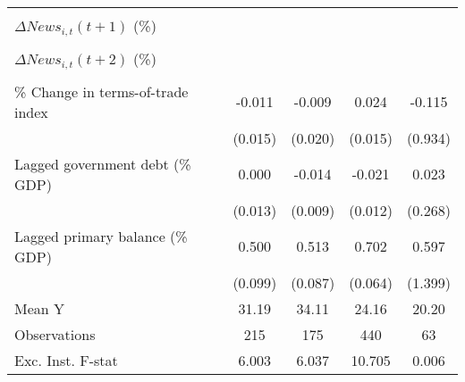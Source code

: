 {\begin{tabular}{l*{4}{c}}
                    &                     &                     &                     &                     \\
\addlinespace
$ \Delta News_{i,t}(t+1)$ (\%)&                     &                     &                     &                     \\
                    &                     &                     &                     &                     \\
\addlinespace
$ \Delta News_{i,t}(t+2)$ (\%)&                     &                     &                     &                     \\
                    &                     &                     &                     &                     \\
\addlinespace
\% Change in terms-of-trade index&      -0.011         &      -0.009         &       0.024         &      -0.115         \\
                    &     (0.015)         &     (0.020)         &     (0.015)         &     (0.934)         \\
\addlinespace
Lagged government debt (\% GDP)&       0.000         &      -0.014         &      -0.021\sym{*}  &       0.023         \\
                    &     (0.013)         &     (0.009)         &     (0.012)         &     (0.268)         \\
\addlinespace
Lagged primary balance (\% GDP)&       0.500\sym{***}&       0.513\sym{***}&       0.702\sym{***}&       0.597         \\
                    &     (0.099)         &     (0.087)         &     (0.064)         &     (1.399)         \\
\midrule
Mean Y              &       31.19         &       34.11         &       24.16         &       20.20         \\
Observations        &         215         &         175         &         440         &          63         \\
Exc. Inst. F-stat   &       6.003         &       6.037         &      10.705         &       0.006         \\
\bottomrule
\end{tabular}
}
